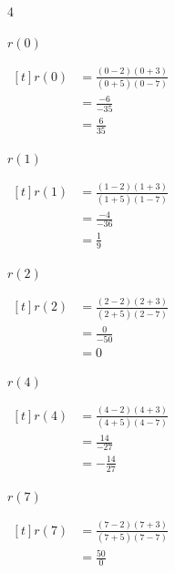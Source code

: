 \begin{exercises}
\begin{problem}
\begin{multicols}{4}
\begin{subproblem}
			 $r(0)$
			 \begin{shortsolution}
				 $\begin{aligned}[t]
						 r(0) & =\frac{(0-2)(0+3)}{(0+5)(0-7)} \\
						      & =\frac{-6}{-35}                \\
						      & =\frac{6}{35}
					 \end{aligned}$
			 \end{shortsolution}
		 \end{subproblem}
		 \begin{subproblem}
			 $r(1)$
			 \begin{shortsolution}
				 $\begin{aligned}[t]
						 r(1) & =\frac{(1-2)(1+3)}{(1+5)(1-7)} \\
						      & =\frac{-4}{-36}                \\
						      & =\frac{1}{9}
					 \end{aligned}$
			 \end{shortsolution}
		 \end{subproblem}
		 \begin{subproblem}
			 $r(2)$
			 \begin{shortsolution}
				 $\begin{aligned}[t]
						 r(2) & =\frac{(2-2)(2+3)}{(2+5)(2-7)} \\
						      & = \frac{0}{-50}                \\
						      & =0
					 \end{aligned}$
			 \end{shortsolution}
		 \end{subproblem}
		 \begin{subproblem}
			 $r(4)$
			 \begin{shortsolution}
				 $\begin{aligned}[t]
						 r(4) & =\frac{(4-2)(4+3)}{(4+5)(4-7)} \\
						      & =\frac{14}{-27}                \\
						      & =-\frac{14}{27}
					 \end{aligned}$
			 \end{shortsolution}
		 \end{subproblem}
		 \begin{subproblem}
			 $r(7)$
			 \begin{shortsolution}
				 $\begin{aligned}[t]
						 r(7) & =\frac{(7-2)(7+3)}{(7+5)(7-7)} \\
						      & =\frac{50}{0}
					 \end{aligned}$


\end{shortsolution}
\end{subproblem}
\end{multicols}
\end{problem}
\end{exercises}
